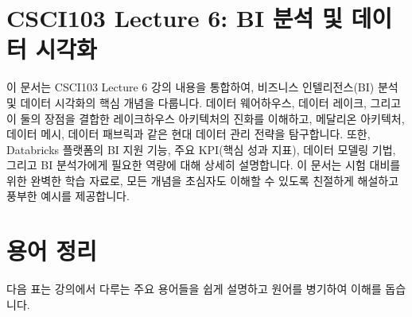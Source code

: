 \documentclass[11pt,a4paper]{article}
\begin{document}
\newpage
\section*{\centering CSCI103 Lecture 6: BI 분석 및 데이터 시각화}

\begin{tcolorbox}[mybox={개요}]
이 문서는 CSCI103 Lecture 6 강의 내용을 통합하여, 비즈니스 인텔리전스(BI) 분석 및 데이터 시각화의 핵심 개념을 다룹니다. 데이터 웨어하우스, 데이터 레이크, 그리고 이 둘의 장점을 결합한 레이크하우스 아키텍처의 진화를 이해하고, 메달리온 아키텍처, 데이터 메시, 데이터 패브릭과 같은 현대 데이터 관리 전략을 탐구합니다. 또한, Databricks 플랫폼의 BI 지원 기능, 주요 KPI(핵심 성과 지표), 데이터 모델링 기법, 그리고 BI 분석가에게 필요한 역량에 대해 상세히 설명합니다. 이 문서는 시험 대비를 위한 완벽한 학습 자료로, 모든 개념을 초심자도 이해할 수 있도록 친절하게 해설하고 풍부한 예시를 제공합니다.
\end{tcolorbox}

\newpage
\section{용어 정리}

다음 표는 강의에서 다루는 주요 용어들을 쉽게 설명하고 원어를 병기하여 이해를 돕습니다.
\end{document}
